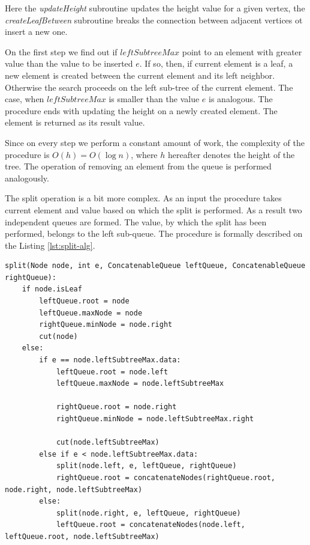 \documentclass[a4paper,UKenglish,cleveref, autoref]{socg-lipics-v2019}
\begin{document}
	Here the \textit{updateHeight} subroutine updates the height value for a given vertex, the \textit{createLeafBetween} subroutine breaks the connection between adjacent vertices ot insert a new one.
	
	On the first step we find out if $leftSubtreeMax$ point to an element with greater value than the value to be inserted $e$. If so, then, if current element is a leaf, a new element is created between the current element and its left neighbor. Otherwise the search proceeds on the left sub-tree of the current element. The case, when $leftSubtreeMax$ is smaller than the value $e$ is analogous. The procedure ends with updating the height on a newly created element. The element is returned as its result value.
	
	Since on every step we perform a constant amount of work, the complexity of the procedure is $O(h)=O(\log n)$, where $h$ hereafter denotes the height of the tree. The operation of removing an element from the queue is performed analogously. 
	
	The split operation is a bit more complex. As an input the procedure takes current element and value based on which the split is performed. As a result two independent queues are formed. The value, by which the split has been performed, belongs to the left sub-queue. The procedure is formally described on the Listing \ref{lst:split-alg}.
	
	\begin{lstlisting}[caption={Queue split algorithm},label={lst:split-alg},captionpos=b]
split(Node node, int e, ConcatenableQueue leftQueue, ConcatenableQueue rightQueue):
    if node.isLeaf
        leftQueue.root = node
        leftQueue.maxNode = node
        rightQueue.minNode = node.right
        cut(node)
    else:
        if e == node.leftSubtreeMax.data:
            leftQueue.root = node.left
            leftQueue.maxNode = node.leftSubtreeMax

            rightQueue.root = node.right
            rightQueue.minNode = node.leftSubtreeMax.right

            cut(node.leftSubtreeMax)
        else if e < node.leftSubtreeMax.data:
            split(node.left, e, leftQueue, rightQueue)
            rightQueue.root = concatenateNodes(rightQueue.root, node.right, node.leftSubtreeMax)
        else:
            split(node.right, e, leftQueue, rightQueue)
            leftQueue.root = concatenateNodes(node.left,  leftQueue.root, node.leftSubtreeMax)
	\end{lstlisting}
	
\end{document}
